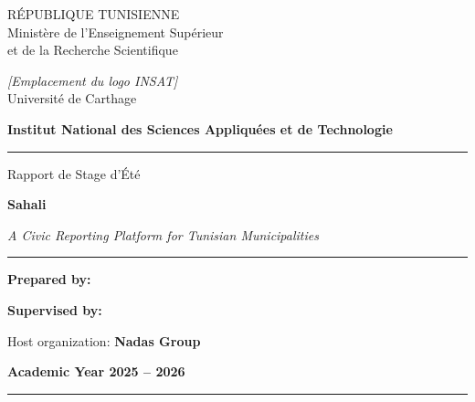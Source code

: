 \documentclass[12pt, a4paper]{report}
\begin{document}
\begin{titlepage}
  \centering
  \begin{french}
  \begin{minipage}{0.48\textwidth}
    \centering
    RÉPUBLIQUE TUNISIENNE\\
    Ministère de l'Enseignement Supérieur\\
    et de la Recherche Scientifique
  \end{minipage}
  \hfill
  \begin{minipage}{0.48\textwidth}
    \centering
    \textit{[Emplacement du logo INSAT]}\\[2pt]
    Université de Carthage
  \end{minipage}

  \vspace{0.6cm}
  {\Large\bfseries Institut National des Sciences Appliquées et de Technologie}\\[2pt]
  \color{primary}\rule{\textwidth}{1.5pt}
  \end{french}

  \vspace{2cm}

  {\color{muted}\large Rapport de Stage d'Été}

  \vspace{0.8cm}
  {\Huge\bfseries\color{dark} Sahali}

  \vspace{0.3cm}
  {\large\itshape\color{muted} A Civic Reporting Platform for Tunisian Municipalities}

  \vspace{0.5cm}
  {\color{amber}\rule{0.6\textwidth}{1pt}}

  \vspace{2cm}

  \begin{minipage}{0.45\textwidth}
    \begin{flushleft}
      \large
      \textbf{Prepared by:}\\
      [NOM DE L'ÉTUDIANT]
    \end{flushleft}
  \end{minipage}
  \hfill
  \begin{minipage}{0.45\textwidth}
    \begin{flushright}
      \large
      \textbf{Supervised by:}\\
      [NOM DE L'ENCADRANTE]
    \end{flushright}
  \end{minipage}

  \vspace{1cm}
  {\large Host organization: \textbf{Nadas Group}}

  \vfill

  {\large\bfseries Academic Year 2025 -- 2026}

  \vspace{0.5cm}
  {\color{primary}\rule{\textwidth}{1.5pt}}
\end{titlepage}
\end{document}
